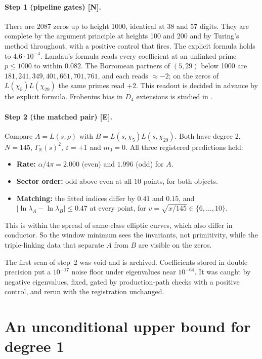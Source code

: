 \documentclass[11pt]{article}
\theoremstyle{remark}
\newcommand{\tagE}{\textbf{[E]}}
\newcommand{\tagN}{\textbf{[N]}}
\begin{document}
\paragraph{Step 1 (pipeline gates) \tagN.} There are 2087 zeros up to height 1000, identical at 38 and 57 digits. They are complete by the argument principle at heights 100 and 200 and by Turing's method throughout, with a positive control that fires. The explicit formula holds to $4.6\cdot10^{-4}$. Landau's formula reads every coefficient at an unlinked prime $p\le1000$ to within $0.082$. The Borromean partners of $(5,29)$ below 1000 are $181,241,349,401,661,701,761$, and each reads $\approx-2$; on the zeros of $L(\chi_5)L(\chi_{29})$ the same primes read $+2$. This readout is decided in advance by the explicit formula. Frobenius bias in $D_4$ extensions is studied in \cite{bailleul21}.

\paragraph{Step 2 (the matched pair) \tagE.} Compare $A=L(s,\rho)$ with $B=L(s,\chi_5)L(s,\chi_{29})$. Both have degree 2, $N=145$, $\Gamma_{\mathbb R}(s)^2$, $\varepsilon=+1$ and $m_0=0$. All three registered predictions held:
\begin{itemize}
\item \textbf{Rate:} $\alpha/4\pi=2.000$ (even) and $1.996$ (odd) for $A$.
\item \textbf{Sector order:} odd above even at all 10 points, for both objects.
\item \textbf{Matching:} the fitted indices differ by $0.41$ and $0.15$, and $|\ln\lambda_A-\ln\lambda_B|\le0.47$ at every point, for $v=\sqrt{x/145}\in\{6,\dots,10\}$.
\end{itemize}
This is within the spread of same-class elliptic curves, which also differ in conductor. So the window minimum sees the invariants, not primitivity, while the triple-linking data that separate $A$ from $B$ are visible on the zeros.

The first scan of step~2 was void and is archived. Coefficients stored in double precision put a $10^{-17}$ noise floor under eigenvalues near $10^{-64}$. It was caught by negative eigenvalues, fixed, gated by production-path checks with a positive control, and rerun with the registration unchanged.

\section{An unconditional upper bound for degree 1}\label{sec:r2}
\end{document}
